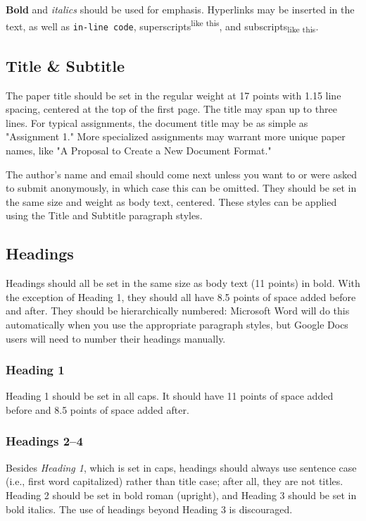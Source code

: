 \documentclass[11pt,a4paper,usenames,dvipsnames]{article}
\begin{document}
\textbf{Bold} and \textit{italics} should be used for emphasis. Hyperlinks may be inserted in the text, as well as \lstinline{in-line code}, superscripts\textsuperscript{like this}, and subscripts\textsubscript{like this}.

\subsection{Title \& Subtitle}
The paper title should be set in the regular weight at 17 points with 1.15 line spacing, centered at the top of the first page. The title may span up to three lines. For typical assignments, the document title may be as simple as "Assignment 1." More specialized assignments may warrant more unique paper names, like "A Proposal to Create a New Document Format."

The author's name and email should come next unless you want to or were asked to submit anonymously, in which case this can be omitted. They should be set in the same size and weight as body text, centered. These styles can be applied using the Title and Subtitle paragraph styles.

\subsection{Headings}
Headings should all be set in the same size as body text (11 points) in bold. With the exception of Heading 1, they should all have 8.5 points of space added before and after. They should be hierarchically numbered: Microsoft Word will do this automatically when you use the appropriate paragraph styles, but Google Docs users will need to number their headings manually.

\subsubsection{Heading 1}
Heading 1 should be set in all caps. It should have 11 points of space added before and 8.5 points of space added after.

\subsubsection{Headings 2–4}
Besides \textit{Heading 1}, which is set in caps, headings should always use sentence case (i.e., first word capitalized) rather than title case; after all, they are not titles. Heading 2 should be set in bold roman (upright), and Heading 3 should be set in bold italics. The use of headings beyond Heading 3 is discouraged.
\end{document}
